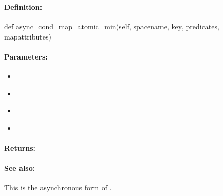 \pagebreak
\subsubsection{}
\label{api:python:async_cond_map_atomic_min}


\paragraph{Definition:}
\begin{pythoncode}
def async_cond_map_atomic_min(self, spacename, key, predicates, mapattributes)
\end{pythoncode}

\paragraph{Parameters:}
\begin{itemize}[noitemsep]
\item {}\\

\item {}\\

\item {}\\

\item {}\\

\end{itemize}

\paragraph{Returns:}


\paragraph{See also:}  This is the asynchronous form of .

\pagebreak
\subsubsection{}
\label{api:python:map_atomic_max}


